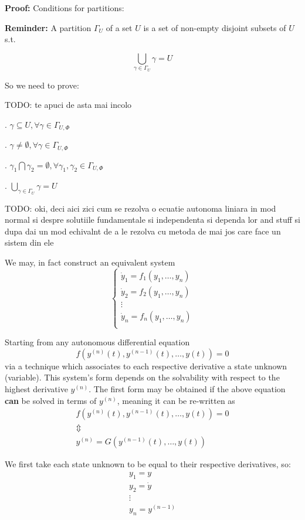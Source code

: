 \textbf{Proof:}
Conditions for partitions:
\par \textbf{Reminder:} A partition $\Gamma_U$ of a set $U$ is a set of non-empty disjoint subsets of $U$ s.t.

\[
  \bigcup_{\gamma\in \Gamma_U} \gamma = U
\]

So we need to prove:

TODO: te apuci de asta mai incolo \par
{}. $\gamma \subseteq U, \forall \gamma \in \Gamma_{U,\Phi}$ \par
{}. $ \gamma \neq \emptyset, \forall \gamma \in \Gamma_{U,\Phi}$ \par
{}. $\gamma_1 \bigcap \gamma_2 = \emptyset, \forall \gamma_1, \gamma_2 \in \Gamma_{U,\Phi}$ \par
{}. $\bigcup_{\gamma\in \Gamma_U} \gamma = U$ \par

TODO: oki, deci aici zici cum se rezolva o ecuatie autonoma liniara in mod normal si despre solutiile fundamentale si independenta si dependa lor and stuff si dupa dai un mod echivalnt de a le rezolva cu metoda de mai jos care face un sistem din ele

We may, in fact construct an equivalent system
\[
  \begin{cases}
    \dot{y}_1 = f_1(y_1,\dots, y_n) \\
    \dot{y}_2 = f_2(y_1,\dots, y_n) \\
    \vdots                          \\
    \dot{y}_n = f_n(y_1,\dots, y_n) \\
  \end{cases}
\]

Starting from any autonomous differential equation
\[
  f(y^{(n)}(t), y^{(n-1)}(t), \dots, y(t))= 0
\]
via a technique which associates to each respective derivative a state unknown (variable).
This system's form depends on the solvability with respect to the highest derivative $y^{(n)}$.
The first form may be obtained if the above equation \textbf{can} be solved in terms of $y^{(n)}$, meaning it can be re-written as
\begin{gather*}
  f(y^{(n)}(t), y^{(n-1)}(t), \dots, y(t))= 0 \\
  \Updownarrow \\
  y^{(n)}  = G(y^{(n-1)}(t), \dots, y(t))
\end{gather*}

We first take each state unknown to be equal to their respective derivatives, so:
\begin{gather*}
  y_1 = y     \\
  y_2 = \dot{y} \\
  \vdots \\
  y_n = y^{(n-1)}
\end{gather*}

